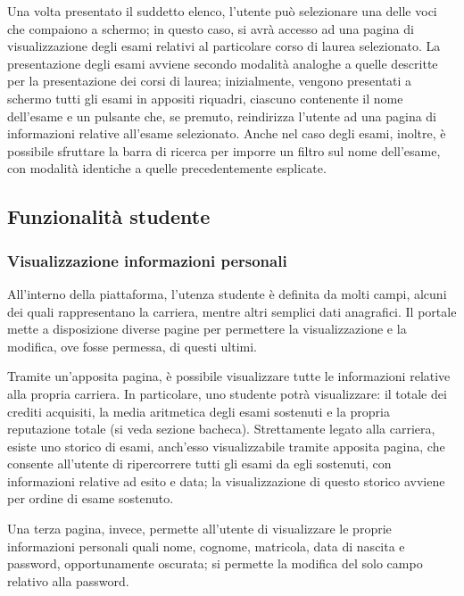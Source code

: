 \documentclass [a4paper,11pt]{book}
\begin{document}
Una volta presentato il suddetto elenco, l'utente può selezionare una delle voci che compaiono a schermo; in questo caso, si avrà accesso ad una pagina di visualizzazione degli esami relativi al particolare corso di laurea selezionato. La presentazione degli esami avviene secondo modalità analoghe a quelle descritte per la presentazione dei corsi di laurea; inizialmente, vengono presentati a schermo tutti gli esami in appositi riquadri, ciascuno contenente il nome dell'esame e un pulsante che, se premuto, reindirizza l'utente ad una pagina di informazioni relative all'esame selezionato. Anche nel caso degli esami, inoltre, è possibile sfruttare la barra di ricerca per imporre un filtro sul nome dell'esame, con modalità identiche a quelle precedentemente esplicate.

\medskip

\subsection{Funzionalità studente}

\subsubsection{Visualizzazione informazioni personali}

All'interno della piattaforma, l'utenza studente è definita da molti campi, alcuni dei quali rappresentano la carriera, mentre altri semplici dati anagrafici. Il portale mette a disposizione diverse pagine per permettere la visualizzazione e la modifica, ove fosse permessa, di questi ultimi.

Tramite un'apposita pagina, è possibile visualizzare tutte le informazioni relative alla propria carriera. In particolare, uno studente potrà visualizzare: il totale dei crediti acquisiti, la media aritmetica degli esami sostenuti e la propria reputazione totale (si veda sezione bacheca). Strettamente legato alla carriera, esiste uno storico di esami, anch'esso visualizzabile tramite apposita pagina, che consente all'utente di ripercorrere tutti gli esami da egli sostenuti, con informazioni relative ad esito e data; la visualizzazione di questo storico avviene per ordine di esame sostenuto.

Una terza pagina, invece, permette all'utente di visualizzare le proprie informazioni personali quali nome, cognome, matricola, data di nascita e password, opportunamente oscurata; si permette la modifica del solo campo relativo alla password.
\end{document}

